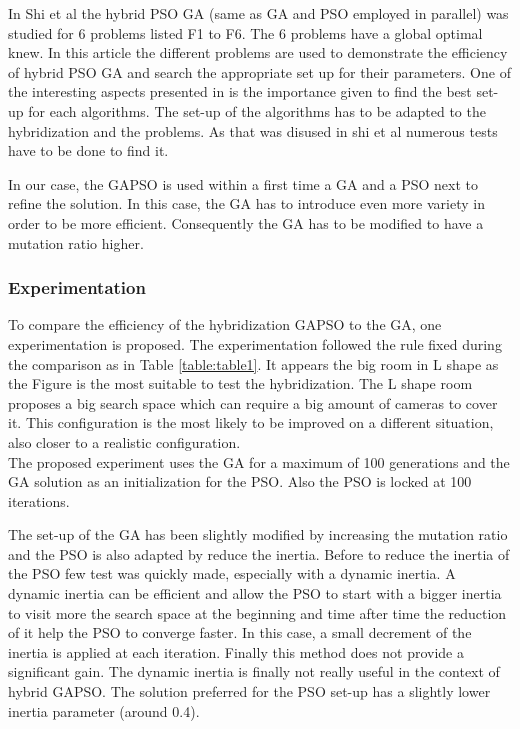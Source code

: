 In Shi et al \cite{77*shi2005} the hybrid PSO GA (same as GA and PSO employed in parallel) was studied for 6  problems listed F1 to F6. The 6 problems have a global optimal knew.  In this article \cite{77*shi2005} the different problems are used to demonstrate the efficiency of hybrid PSO GA and search the appropriate set up for their parameters. One of the interesting aspects presented in \cite{77*shi2005} is the importance given to find  the best set-up for each algorithms. 
The set-up of the algorithms has to be adapted to the hybridization and the problems. As that was disused in shi et al \cite{77*shi2005}  numerous tests have to be done to find it.

 In our case, the GAPSO is used within a first time a GA and a PSO next to refine the solution. In this case, the GA has to introduce even more variety in order to be more efficient. Consequently the GA has to be modified to have a mutation ratio higher.   



\subsubsection{Experimentation }
To compare the efficiency of the hybridization GAPSO to the GA, one experimentation is proposed.
The experimentation followed the rule fixed during the comparison as in Table \ref{table:table1}. %
It appears the big room in L shape as the Figure  is the most suitable to test the hybridization.  %
The L shape room proposes a big search space which can require a big amount of cameras to cover it. This configuration is the most likely to be improved on a different situation, also closer to a realistic configuration.\\
The proposed experiment uses the GA for a maximum of 100 generations and the GA solution as an initialization for the PSO. Also the PSO is locked at 100 iterations. %

The set-up of the GA has been slightly modified by increasing the mutation ratio and the PSO is also adapted by reduce the inertia.
 Before to reduce the inertia of the PSO few test was quickly made, especially with a dynamic inertia. A dynamic inertia can be efficient and allow the PSO to start with a bigger inertia to visit more the search space at the beginning and time after time the reduction of it help the PSO to converge faster. In this case, a small decrement of the inertia is applied at each iteration. Finally this method does not provide a significant gain. The dynamic inertia is finally  not really useful in the context of hybrid GAPSO. The solution  preferred for the PSO set-up has a slightly lower inertia parameter (around 0.4).


